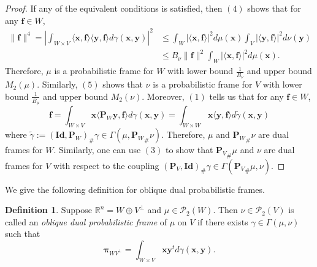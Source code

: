 \documentclass{amsart}
\numberwithin{equation}{section}
\newcommand{\bP}{{\mathbf P}}
\newcommand{\bpi}{{\boldsymbol{\pi}}}
\theoremstyle{plain}
\theoremstyle{remark}
\theoremstyle{definition}
\newtheorem{definition}[theorem]{Definition}
\begin{document}
\begin{proof}
If any of the equivalent conditions is satisfied, then $(4)$ shows that for any $\mathbf{f} \in W$, 
    \begin{equation*}
    \begin{split}
         \| \mathbf{f}\|^4 = \left|\int_{W \times V} \langle \mathbf{x}, \mathbf{f} \rangle \langle \mathbf{y}, \mathbf{f} \rangle d\gamma(\mathbf{x}, \mathbf{y}) \right|^{2}
         &\leq \int_{W} |\langle \mathbf{x}, \mathbf{f} \rangle|^2 d\mu(\mathbf{x}) \int_{V} |\langle \mathbf{y}, \mathbf{f} \rangle|^2 d\nu(\mathbf{y}) \\
     &\leq B_\nu \|\mathbf{f}\|^2 \int_{W} |\langle \mathbf{x}, \mathbf{f} \rangle|^2 d\mu(\mathbf{x}).
    \end{split}
    \end{equation*}
 Therefore, $\mu$ is a probabilistic frame for $W$ with lower bound $\frac{1}{B_\nu}$ and upper bound $M_2(\mu)$. Similarly, $(5)$ shows that $\nu$ is a probabilistic frame for $V$ with lower bound $\frac{1}{B_\mu}$ and upper bound $M_2(\nu)$.
Moreover, $(1)$ tells us that for any $ \mathbf{f} \in W$, 
\begin{equation*}
        \mathbf{f} =  \int_{W \times V} \mathbf{x} \langle \bP_W \mathbf{y}, \mathbf{f} \rangle d\gamma(\mathbf{x}, \mathbf{y}) = \int_{W \times W} \mathbf{x} \langle \mathbf{y}, \mathbf{f} \rangle d\tilde{\gamma}(\mathbf{x}, \mathbf{y}) 
    \end{equation*}
where $\tilde{\gamma}:=(\mathbf{Id}, \bP_W)_\#\gamma \in \Gamma(\mu, {\bP_W}_\#\nu)$.
Therefore, $\mu$ and ${\bP_W}_\#\nu$ are dual frames for $W$. Similarly, one can use $(3)$ to show that  ${\bP_V}_\#\mu$ and $\nu$ are dual frames for $V$ with respect to the coupling $(\bP_V, \mathbf{Id})_\#\gamma \in \Gamma({\bP_V}_\#\mu, \nu)$.
\end{proof}


We give the following definition for oblique dual probabilistic frames. 

\begin{definition}
    Suppose $\mathbb{R}^n = W \oplus V^\perp$ and $\mu \in \mathcal{P}_2(W)$. Then $\nu \in \mathcal{P}_2(V)$ is called an \textit{oblique dual probabilistic frame} of $\mu$ on $V$ if there exists $\gamma \in \Gamma(\mu, \nu)$ such that
    \begin{equation*}
       \bpi_{WV^\perp} = \int_{W \times V} \mathbf{x} \mathbf{y}^t d\gamma(\mathbf{x}, \mathbf{y}).
    \end{equation*}
\end{definition}
\end{document}
